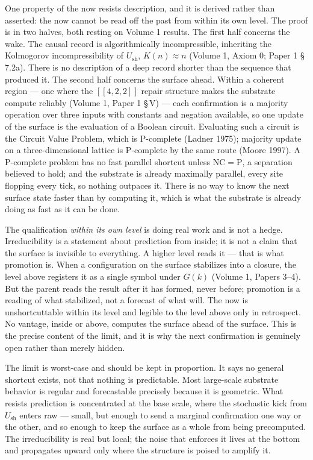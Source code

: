 \documentclass[11pt,oneside]{report}
\theoremstyle{definition}
\theoremstyle{remark}
\begin{document}
One property of the now resists description, and it is derived rather
than asserted: the now cannot be read off the past from within its own
level. The proof is in two halves, both resting on Volume 1 results. The
first half concerns the wake. The causal record is algorithmically
incompressible, inheriting the Kolmogorov incompressibility of
\ensuremath{U_{\mathrm{sh}}}, \ensuremath{K(n) \approx n} (Volume 1, Axiom
0; Paper 1 \S\,7.2a). There is no description of a deep record shorter
than the sequence that produced it. The second half concerns the surface
ahead. Within a coherent region --- one where the \ensuremath{[[4,2,2]]}
repair structure makes the substrate compute reliably (Volume 1, Paper 1
\S\,V) --- each confirmation is a majority operation over three inputs
with constants and negation available, so one update of the surface is
the evaluation of a Boolean circuit. Evaluating such a circuit is the
Circuit Value Problem, which is P-complete (Ladner 1975); majority update
on a three-dimensional lattice is P-complete by the same route (Moore
1997). A P-complete problem has no fast parallel shortcut unless
\ensuremath{\mathrm{NC} = \mathrm{P}}, a separation believed to hold; and
the substrate is already maximally parallel, every site flopping every
tick, so nothing outpaces it. There is no way to know the next surface
state faster than by computing it, which is what the substrate is already
doing as fast as it can be done.

The qualification \emph{within its own level} is doing real work and is
not a hedge. Irreducibility is a statement about prediction from inside;
it is not a claim that the surface is invisible to everything. A higher
level reads it --- that is what promotion is. When a configuration on the
surface stabilizes into a closure, the level above registers it as a
single symbol under \ensuremath{G(k)} (Volume 1, Papers 3--4). But the
parent reads the result after it has formed, never before; promotion is a
reading of what stabilized, not a forecast of what will. The now is
unshortcuttable within its level and legible to the level above only in
retrospect. No vantage, inside or above, computes the surface ahead of
the surface. This is the precise content of the limit, and it is why the
next confirmation is genuinely open rather than merely hidden.

The limit is worst-case and should be kept in proportion. It says no
general shortcut exists, not that nothing is predictable. Most
large-scale substrate behavior is regular and forecastable precisely
because it is geometric. What resists prediction is concentrated at the
base scale, where the stochastic kick from \ensuremath{U_{\mathrm{sh}}}
enters raw --- small, but enough to send a marginal confirmation one way
or the other, and so enough to keep the surface as a whole from being
precomputed. The irreducibility is real but local; the noise that
enforces it lives at the bottom and propagates upward only where the
structure is poised to amplify it.
\end{document}
